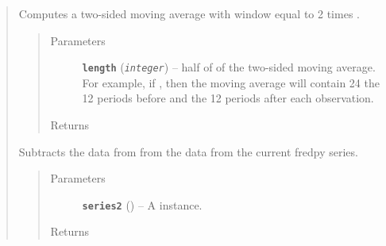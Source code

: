 \documentclass[letterpaper,10pt,openany,oneside]{sphinxmanual}
\begin{document}
\begin{fulllineitems}
\begin{quote}
\begin{fulllineitems}
\end{fulllineitems}


\begin{fulllineitems}
\label{series_class:fredpy.series.ma2side}
Computes a two-sided moving average with window equal to 2 times .
\begin{quote}\begin{description}
\item[{Parameters}] \leavevmode
\textbf{\texttt{length}} (\emph{\texttt{integer}}) -- half of  of the two-sided moving average. For example, if , then the moving average will contain 24 the 12 periods before and the 12 periods after each observation.

\item[{Returns}] \leavevmode
{\hyperref[series_class:fredpy.series]{}}

\end{description}\end{quote}

\end{fulllineitems}


\begin{fulllineitems}
\label{series_class:fredpy.series.minus}
Subtracts the data from  from the data from the current fredpy series.
\begin{quote}\begin{description}
\item[{Parameters}] \leavevmode
\textbf{\texttt{series2}} ({\hyperref[series_class:fredpy.series]{}}) -- A  instance.

\item[{Returns}] \leavevmode
{\hyperref[series_class:fredpy.series]{}}

\end{description}\end{quote}

\end{fulllineitems}



\end{quote}
\end{fulllineitems}
\end{document}

